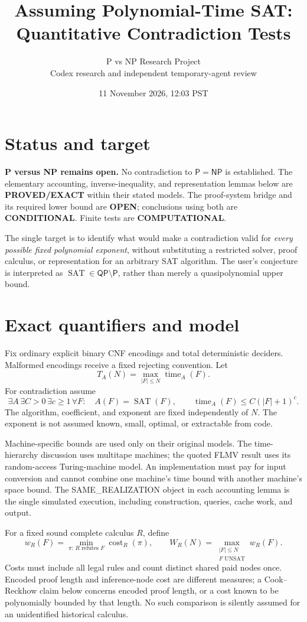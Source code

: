 \documentclass[11pt]{article}
\title{Assuming Polynomial-Time SAT: Quantitative Contradiction Tests}
\author{P vs NP Research Project\\Codex research and independent temporary-agent review}
\date{11 November 2026, 12:03 PST}
\newcommand{\Pclass}{\mathsf P}
\newcommand{\NP}{\mathsf{NP}}
\newcommand{\QP}{\mathsf{QP}}
\newcommand{\SAT}{\operatorname{SAT}}
\begin{document}
\maketitle

\section*{Status and target}
\textbf{P versus NP remains open.} No contradiction to $\Pclass=\NP$ is established.
The elementary accounting, inverse-inequality, and representation lemmas below
are \textbf{PROVED/EXACT} within their stated models. The proof-system bridge
and its required lower bound are \textbf{OPEN}; conclusions using both are
\textbf{CONDITIONAL}. Finite tests are \textbf{COMPUTATIONAL}.

The single target is to identify what would make a contradiction valid for
\emph{every possible fixed polynomial exponent}, without substituting a
restricted solver, proof calculus, or representation for an arbitrary SAT
algorithm. The user's conjecture is interpreted as $\SAT\in\QP\setminus\Pclass$,
rather than merely a quasipolynomial upper bound.

\section*{Exact quantifiers and model}
Fix ordinary explicit binary CNF encodings and total deterministic deciders.
Malformed encodings receive a fixed rejecting convention. Let
\[
 T_A(N)=\max_{|F|\le N}\operatorname{time}_A(F).
\]
For contradiction assume
\[
 \exists A\,\exists C>0\,\exists c\ge1\,
 \forall F:\quad A(F)=\SAT(F),\qquad
 \operatorname{time}_A(F)\le C(|F|+1)^c.
 \tag{H}
\]
The algorithm, coefficient, and exponent are fixed independently of $N$.
The exponent is not assumed known, small, optimal, or extractable from code.

Machine-specific bounds are used only on their original models. The
time-hierarchy discussion uses multitape machines; the quoted FLMV result
uses its random-access Turing-machine model. An implementation must pay for
input conversion and cannot combine one machine's time bound with another
machine's space bound. The SAME\_REALIZATION object in each accounting
lemma is the single simulated execution, including construction, queries,
cache work, and output.

For a fixed sound complete calculus $R$, define
\[
 w_R(F)=\min_{\pi:\,R\text{ refutes }F}\operatorname{cost}_R(\pi),\qquad
 W_R(N)=\max_{\substack{|F|\le N\\F\text{ UNSAT}}}w_R(F).
\]
Costs must include all legal rules and count distinct shared paid nodes once.
Encoded proof length and inference-node cost are different measures; a
Cook--Reckhow claim below concerns encoded proof length, or a cost known to
be polynomially bounded by that length. No such comparison is silently
assumed for an unidentified historical calculus.
\end{document}
